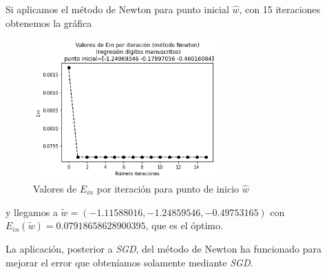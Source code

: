 \documentclass[11pt,a4paper]{article}
\theoremstyle{definition}
\begin{document}
\begin{itemize}
	Si aplicamos el método de Newton para punto inicial $\hat w$, con 15 iteraciones obtenemos la gráfica
	\begin{figure}[H]
		\centering
		\includegraphics[width=0.63\textwidth]{images/newton_digitos_manus}
		\caption{Valores de $E_{in}$ por iteración para punto de inicio $\hat w$}
	\end{figure}
	y llegamos a $\tilde w=(-1.11588016, -1.24859546, -0.49753165)$ con $E_{in}(\tilde w)=0.07918658628900395$, que es el óptimo.
	
	La aplicación, posterior a \textit{SGD}, del método de Newton ha funcionado para mejorar el error que obteníamos solamente mediante \textit{SGD}.
	\end{itemize}
\end{document}
